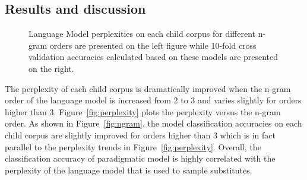 \subsection{Results and discussion}
\begin{figure}[h!]
  \caption{Language Model perplexities on each child corpus for different
  n-gram orders are presented on the left figure while 10-fold cross validation
  accuracies calculated based on these models are presented on the right.} 
\end{figure}

The perplexity of each child corpus is dramatically improved when the n-gram
order of the language model is increased from 2 to 3 and varies slightly for
orders higher than 3.  Figure~\ref{fig:perplexity} plots the perplexity versus
the n-gram order.  As shown in Figure~\ref{fig:ngram}, the model classification
accuracies on each child corpus are slightly improved for orders higher than 3
which is in fact parallel to the perplexity trends in
Figure~\ref{fig:perplexity}.  Overall, the classification accuracy of
paradigmatic model is highly correlated with the perplexity of the language
model that is used to sample substitutes.

